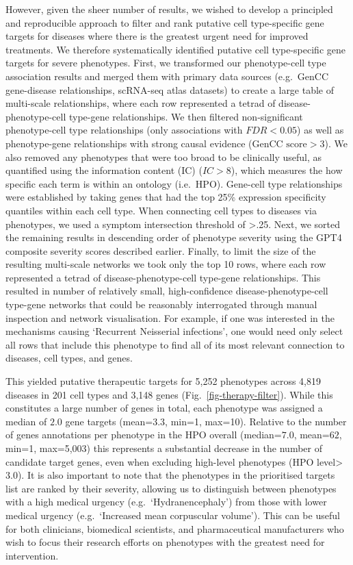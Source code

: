 \documentclass[
]{article}
\begin{document}
However, given the sheer number of results, we wished to develop a
principled and reproducible approach to filter and rank putative cell
type-specific gene targets for diseases where there is the greatest
urgent need for improved treatments. We therefore systematically
identified putative cell type-specific gene targets for severe
phenotypes. First, we transformed our phenotype-cell type association
results and merged them with primary data sources (e.g.~GenCC
gene-disease relationships, scRNA-seq atlas datasets) to create a large
table of multi-scale relationships, where each row represented a tetrad
of disease-phenotype-cell type-gene relationships. We then filtered
non-significant phenotype-cell type relationships (only associations
with \(FDR<0.05\)) as well as phenotype-gene relationships with strong
causal evidence (\(\text{GenCC score}>3\)). We also removed any
phenotypes that were too broad to be clinically useful, as quantified
using the information content (IC) (\(IC>8\)), which measures the how
specific each term is within an ontology (i.e.~HPO). Gene-cell type
relationships were established by taking genes that had the top 25\%
expression specificity quantiles within each cell type. When connecting
cell types to diseases via phenotypes, we used a symptom intersection
threshold of \textgreater.25. Next, we sorted the remaining results in
descending order of phenotype severity using the GPT4 composite severity
scores described earlier. Finally, to limit the size of the resulting
multi-scale networks we took only the top 10 rows, where each row
represented a tetrad of disease-phenotype-cell type-gene relationships.
This resulted in number of relatively small, high-confidence
disease-phenotype-cell type-gene networks that could be reasonably
interrogated through manual inspection and network visualisation. For
example, if one was interested in the mechanisms causing `Recurrent
Neisserial infections', one would need only select all rows that include
this phenotype to find all of its most relevant connection to diseases,
cell types, and genes.

This yielded putative therapeutic targets for 5,252 phenotypes across
4,819 diseases in 201 cell types and 3,148 genes
(Fig.~\ref{fig-therapy-filter}). While this constitutes a large number
of genes in total, each phenotype was assigned a median of \(2.0\) gene
targets (mean=\(3.3\), min=1, max=10). Relative to the number of genes
annotations per phenotype in the HPO overall (median=\(7.0\),
mean=\(62\), min=1, max=5,003) this represents a substantial decrease in
the number of candidate target genes, even when excluding high-level
phenotypes (HPO level\textgreater{}\(3.0\)). It is also important to
note that the phenotypes in the prioritised targets list are ranked by
their severity, allowing us to distinguish between phenotypes with a
high medical urgency (e.g.~`Hydranencephaly') from those with lower
medical urgency (e.g.~`Increased mean corpuscular volume'). This can be
useful for both clinicians, biomedical scientists, and pharmaceutical
manufacturers who wish to focus their research efforts on phenotypes
with the greatest need for intervention.
\end{document}
